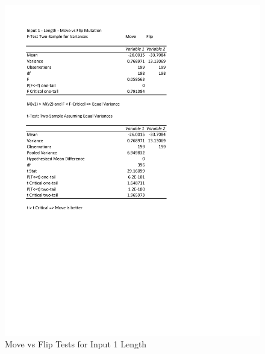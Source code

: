 \documentclass[times]{article}
\begin{document}
	\begin{figure}
		\caption{Move vs Flip Tests for Input 1 Length}
		\label{fig:1mutation}
		\includegraphics[width=\textwidth]{./t_test/1_mutation.pdf}
	\end{figure}
\end{document}
